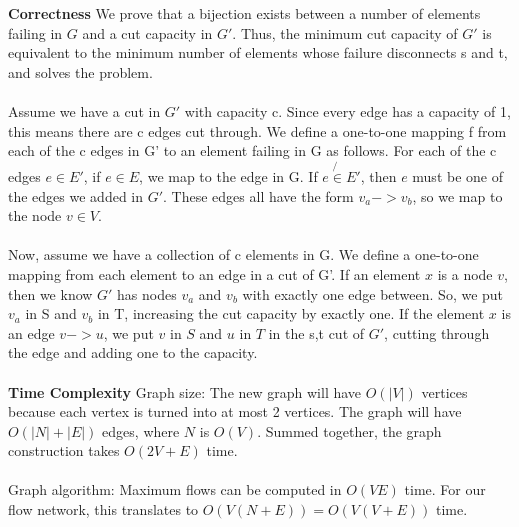 \documentclass[11pt]{article}
\begin{document}
\begin{solution}
\textbf{Correctness}
We prove that a bijection exists between a number of elements failing in $G$ and a cut capacity in $G'$. Thus, the minimum cut capacity of $G'$ is equivalent to the minimum number of elements whose failure disconnects s and t, and solves the problem. \\ \\
Assume we have a cut in $G'$ with capacity c. Since every edge has a capacity of 1, this means there are c edges cut through. We define a one-to-one mapping f from each of the c edges in G' to an element failing in G as follows. For each of the c edges $e \in E'$, if $e \in E$, we map to the edge in G. If $e \not{\in} E'$, then $e$ must be one of the edges we added in $G'$. These edges all have the form $v_a -> v_b$, so we map to the node $v \in V$. \\ \\
Now, assume we have a collection of c elements in G. We define a one-to-one mapping from each element to an edge in a cut of G'. If an element $x$ is a node $v$, then we know $G'$ has nodes $v_a$ and $v_b$ with exactly one edge between. So, we put $v_a$ in S and $v_b$ in T, increasing the cut capacity by exactly one. If the element $x$ is an edge $v -> u$, we put $v$ in $S$ and $u$ in $T$ in the s,t cut of $G'$, cutting through the edge and adding one to the capacity. \\ \\

\textbf{Time Complexity}
Graph size: The new graph will have $O(|V|)$ vertices because each vertex is turned into at most 2 vertices. The graph will have $O(|N|+|E|)$ edges, where $N$ is $O(V)$. Summed together, the graph construction takes $O(2V+E)$ time. \\ \\
Graph algorithm: Maximum flows can be computed in $O(VE)$ time. For our flow network, this translates to $O(V(N+E))=O(V(V+E))$ time.

\end{solution}


\clearpage
{}
\end{document}
